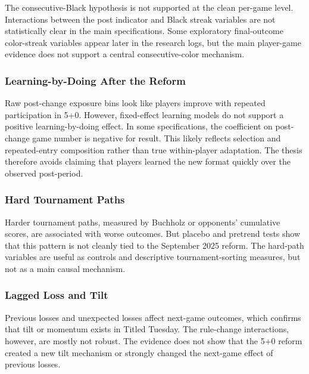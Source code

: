 The consecutive-Black hypothesis is not supported at the clean per-game level. Interactions between the post indicator and Black streak variables are not statistically clear in the main specifications. Some exploratory final-outcome color-streak variables appear later in the research logs, but the main player-game evidence does not support a central consecutive-color mechanism.

\subsubsection{Learning-by-Doing After the Reform}

Raw post-change exposure bins look like players improve with repeated participation in 5+0. However, fixed-effect learning models do not support a positive learning-by-doing effect. In some specifications, the coefficient on post-change game number is negative for result. This likely reflects selection and repeated-entry composition rather than true within-player adaptation. The thesis therefore avoids claiming that players learned the new format quickly over the observed post-period.

\subsubsection{Hard Tournament Paths}

Harder tournament paths, measured by Buchholz or opponents' cumulative scores, are associated with worse outcomes. But placebo and pretrend tests show that this pattern is not cleanly tied to the September 2025 reform. The hard-path variables are useful as controls and descriptive tournament-sorting measures, but not as a main causal mechanism.

\subsubsection{Lagged Loss and Tilt}

Previous losses and unexpected losses affect next-game outcomes, which confirms that tilt or momentum exists in Titled Tuesday. The rule-change interactions, however, are mostly not robust. The evidence does not show that the 5+0 reform created a new tilt mechanism or strongly changed the next-game effect of previous losses.

